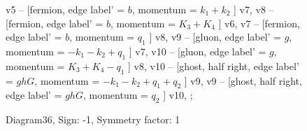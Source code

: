 \documentclass{revtex4}
\begin{document}
\begin{figure}[!htb]
\begin{center}
{v5 -- [fermion, edge label' = \(b\), momentum = \(k_{1} + k_{2}\) ] v7, 
v8 -- [fermion, edge label' = \(b\), momentum = \(K_{3} + K_{4}\) ] v6, 
v7 -- [fermion, edge label' = \(b\), momentum = \(q_{1}\) ] v8, 
v9 -- [gluon, edge label' = \(g\), momentum = \(-k_{1} - k_{2} + q_{1}\) ] v7, 
v10 -- [gluon, edge label' = \(g\), momentum = \(K_{3} + K_{4} - q_{1}\) ] v8, 
v10 -- [ghost, half right, edge label' = \(ghG\), momentum = \(-k_{1} - k_{2} + q_{1} + q_{2}\) ] v9, 
v9 -- [ghost, half right, edge label' = \(ghG\), momentum = \(q_{2}\) ] v10, 
};
\end{center}
\caption{Diagram36, Sign: -1, Symmetry factor: 1}
\end{figure}
\newpage
\end{document}
